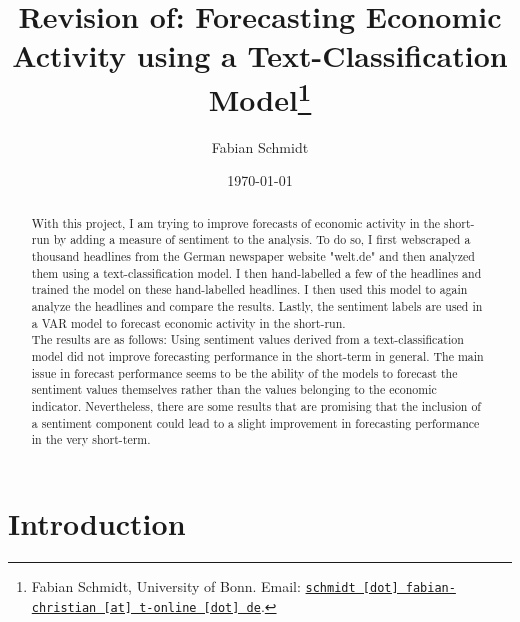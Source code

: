 \documentclass[11pt, a4paper, leqno]{article}
\begin{document}
\title{Revision of: Forecasting Economic Activity using a Text-Classification Model\thanks{Fabian Schmidt, University of Bonn. Email: \href{mailto:schmidt.fabian-christian@t-online.de}{\nolinkurl{schmidt [dot] fabian-christian [at] t-online [dot] de}}.}}

\author{Fabian Schmidt}

\date{
    \today
}

\maketitle


\begin{abstract}
    With this project, I am trying to improve forecasts of economic activity in the short-run by adding a measure of sentiment to the analysis. To do so, I first webscraped a thousand headlines from the German newspaper website "welt.de" and then analyzed them using a text-classification model.
    I then hand-labelled a few of the headlines and trained the model on these hand-labelled headlines. I then used this model to again analyze the headlines and compare the results. Lastly, the sentiment labels are used in a VAR model to forecast economic activity in the short-run.\\
    The results are as follows: Using sentiment values derived from a text-classification model did not improve forecasting performance in the short-term in general. The main issue in forecast performance seems to be the ability of the models to forecast the sentiment values themselves rather than the values belonging to the economic indicator. Nevertheless, there are some results that are promising that the inclusion of a sentiment component could lead to a slight improvement in forecasting performance in the very short-term.
\end{abstract}

\clearpage


\section{Introduction} %
\label{sec:introduction}
\end{document}
